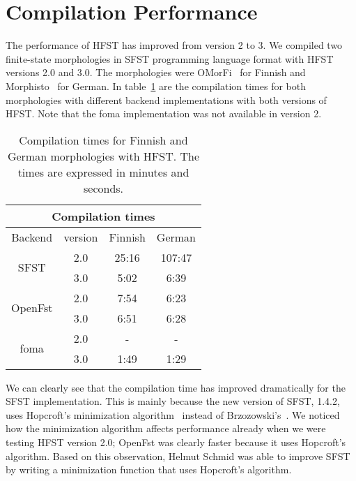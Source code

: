 \documentclass{llncs}
\begin{document}
\section{Compilation Performance}

The performance of HFST has improved from version 2 to 3. 
We compiled two finite-state morphologies in SFST programming language format
with HFST versions 2.0 and 3.0. 
The morphologies were OMorFi~\cite{pirinen/2008} for Finnish and 
Morphisto~\cite{zielinski/2009} for German.
In table~\ref{tab:compilation_times} are the compilation times 
for both morphologies with 
different backend implementations with both versions of HFST. 
Note that the foma implementation was not available in version 2.

\begin{table}
\centering
  \begin{tabular}{ c | c | c | c }
  \multicolumn{4}{c}{Compilation times} \\ \hline
  Backend                  & version & Finnish & German \\ \hline
  \multirow{2}{*}{SFST}    & 2.0     & 25:16   & 107:47 \\
                           & 3.0     & 5:02    & 6:39 \\ \hline
  \multirow{2}{*}{OpenFst} & 2.0     & 7:54    & 6:23 \\
                           & 3.0     & 6:51    & 6:28 \\ \hline
  \multirow{2}{*}{foma}    & 2.0     & -       & - \\
                           & 3.0     & 1:49    & 1:29 \\
  \end{tabular}
  \caption{Compilation times for Finnish and German morphologies with
    HFST. The times are expressed in minutes and seconds.}
  \label{tab:compilation_times}
\end{table}

We can clearly see that the compilation time has improved dramatically
for the SFST implementation.
This is mainly because the new version of SFST, 1.4.2, uses Hopcroft's
minimization algorithm~\cite{hopcroft/1971} instead of 
Brzozowski's~\cite{brzozowski/1964}. 
We noticed how the minimization algorithm affects performance
already when we were testing HFST version 2.0; 
OpenFst was clearly faster because it uses Hopcroft's algorithm. 
Based on this observation, Helmut Schmid was able to improve SFST by 
writing a minimization function that uses Hopcroft's algorithm.
\end{document}
